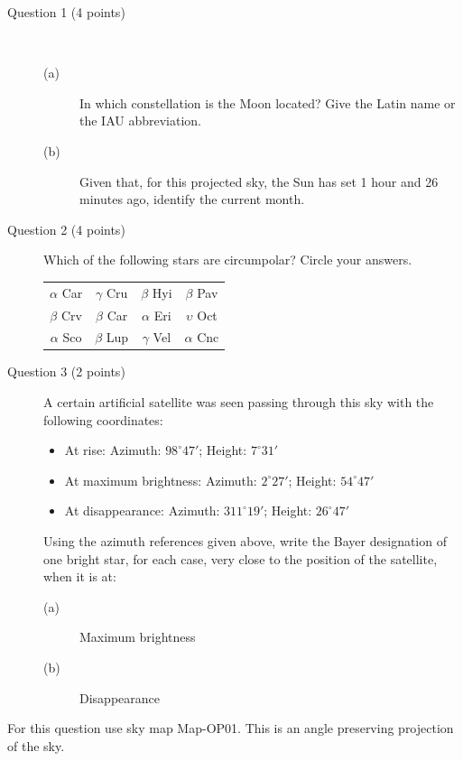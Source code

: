 \begin{description}
\item[Question 1 (4 points)]~
  \begin{description}
  \item[(a)] In which constellation is the Moon located? Give the Latin name
    or the IAU abbreviation.
  \item[(b)] Given that, for this projected sky, the Sun has set 1 hour and
    26 minutes ago, identify the current month.
  \end{description}
\item[Question 2 (4 points)] Which of the following stars are circumpolar?
  Circle your answers.

  \begin{center}
  \begin{tabular}{cccc}
  $\alpha$ Car & $\gamma$ Cru & $\beta$ Hyi & $\beta$ Pav \\
  $\beta$ Crv & $\beta$ Car & $\alpha$ Eri & $\upsilon$ Oct \\
  $\alpha$ Sco & $\beta$ Lup & $\gamma$ Vel & $\alpha$ Cnc \\
  \end{tabular}
  \end{center}
\item[Question 3 (2 points)] A certain artificial satellite was seen passing
  through this sky with the following coordinates:
  \begin{itemize}
  \item At rise: Azimuth: $98^\circ 47'$; Height: $7^\circ 31'$
  \item At maximum brightness: Azimuth: $2^\circ 27'$; Height:
    $54^\circ 47'$
  \item At disappearance: Azimuth: $311^\circ 19'$; Height: $26^\circ 47'$
  \end{itemize}
  Using the azimuth references given above, write the Bayer designation of
  one bright star, for each case, very close to the position of the
  satellite, when it is at:
  \begin{description}
  \item[(a)] Maximum brightness
  \item[(b)] Disappearance
  \end{description}
\end{description}

For this question use sky map Map-OP01. This is an angle preserving
projection of the sky.

